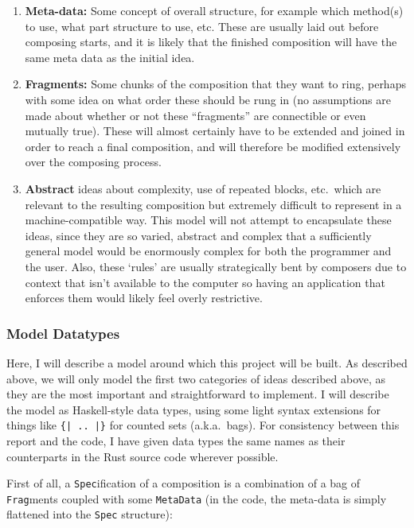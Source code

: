 \documentclass[12pt]{article}
\begin{document}
\begin{enumerate}
    \item \textbf{Meta-data:} Some concept of overall structure, for example which method(s) to use,
        what part structure to use, etc.  These are usually laid out before composing starts, and
        it is likely that the finished composition will have the same meta data as the initial idea.
    \item \textbf{Fragments:} Some chunks of the composition that they want to ring, perhaps with
        some idea on what order these should be rung in (no assumptions are made about whether or
        not these ``fragments'' are connectible or even mutually true).  These will almost certainly
        have to be extended and joined in order to reach a final composition, and will therefore be
        modified extensively over the composing process.
    \item \textbf{Abstract} ideas about complexity, use of repeated blocks, etc.\ which are
        relevant to the resulting composition but extremely difficult to represent in a
        machine-compatible way.  This model will not attempt to encapsulate these ideas, since they
        are so varied, abstract and complex that a sufficiently general model would be enormously
        complex for both the programmer and the user.  Also, these `rules' are usually strategically
        bent by composers due to context that isn't available to the computer so having an
        application that enforces them would likely feel overly restrictive.
\end{enumerate}

\subsubsection{Model Datatypes}

Here, I will describe a model around which this project will be built.  As described above, we will
only model the first two categories of ideas described above, as they are the most important and
straightforward to implement.  I will describe the model as Haskell-style data types, using some
light syntax extensions for things like \verb+{| .. |}+ for counted sets (a.k.a.\ bags).  For
consistency between this report and the code, I have given data types the same
names as their counterparts in the Rust source code wherever possible.

First of all, a \verb|Spec|ification of a composition is a combination of a bag of \verb|Frag|ments
coupled with some \verb|MetaData| (in the code, the meta-data is simply flattened into the
\verb|Spec| structure):
\end{document}
